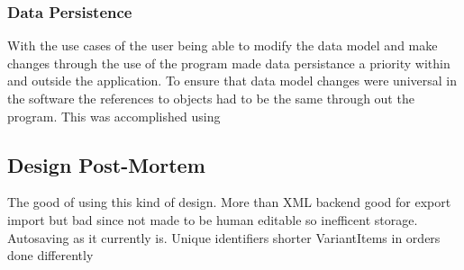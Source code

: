 \subsubsection{Data Persistence}
With the use cases of the user being able to modify the data model and make changes through the use of the program made data persistance a priority within and outside the application. To ensure that data model changes were universal in the software the references to objects had to be the same through out the program. This was accomplished using 

\subsection{Design Post-Mortem}
The good of using this kind of design.
More than XML backend good for export import but bad since not made to be human editable so inefficent storage.
Autosaving as it currently is.
Unique identifiers shorter
VariantItems in orders done differently